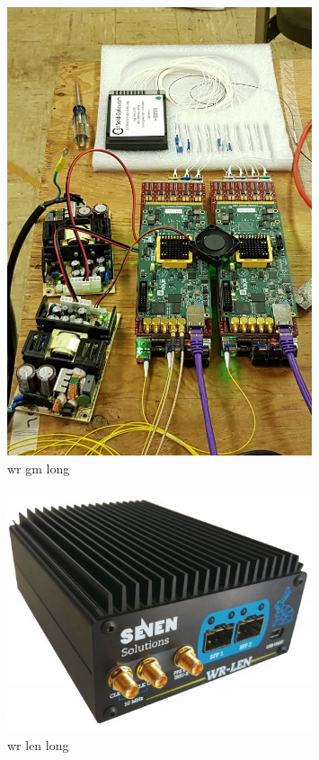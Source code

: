 \begin{figure} %
    \includegraphics[width=0.8\textwidth]{diagrams/5-daq/wr_gm.jpg}
    \caption[wr gm short]{wr gm long}
    \label{fig:wr_gm}
\end{figure} %

\begin{figure} %
    \includegraphics[width=0.8\textwidth]{diagrams/5-daq/wr_len.jpg}
    \caption[wr len short]{wr len long}
    \label{fig:wr_len}
\end{figure} %

